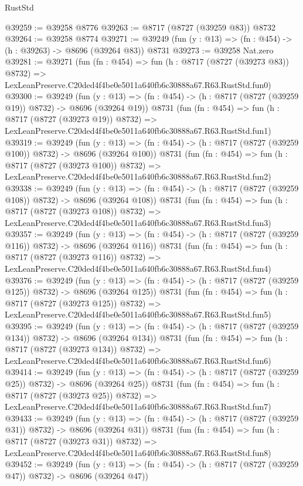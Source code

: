 \begin{lexlean}{RustStd}
\begin{coremodule}
@39259 := @39258 @8776
@39263 := @8717 (@8727 (@39259 @83)) @8732
@39264 := @39258 @8774
@39271 := @39249 (fun (y : @13) => (fn : @454) -> (h : @39263) -> @8696 (@39264 @83)) @8731
@39273 := @39258 Nat.zero
@39281 := @39271
    (fun (fn : @454) =>
    fun (h : @8717 (@8727 (@39273 @83)) @8732) =>
    LexLeanPreserve.C20ded4f4be0e5011a640fb6c30888a67.R63.RustStd.fun0)
@39300 := @39249
    (fun (y : @13) => (fn : @454) -> (h : @8717 (@8727 (@39259 @19)) @8732) -> @8696 (@39264 @19))
    @8731
    (fun (fn : @454) =>
    fun (h : @8717 (@8727 (@39273 @19)) @8732) =>
    LexLeanPreserve.C20ded4f4be0e5011a640fb6c30888a67.R63.RustStd.fun1)
@39319 := @39249
    (fun (y : @13) => (fn : @454) -> (h : @8717 (@8727 (@39259 @100)) @8732) -> @8696 (@39264 @100))
    @8731
    (fun (fn : @454) =>
    fun (h : @8717 (@8727 (@39273 @100)) @8732) =>
    LexLeanPreserve.C20ded4f4be0e5011a640fb6c30888a67.R63.RustStd.fun2)
@39338 := @39249
    (fun (y : @13) => (fn : @454) -> (h : @8717 (@8727 (@39259 @108)) @8732) -> @8696 (@39264 @108))
    @8731
    (fun (fn : @454) =>
    fun (h : @8717 (@8727 (@39273 @108)) @8732) =>
    LexLeanPreserve.C20ded4f4be0e5011a640fb6c30888a67.R63.RustStd.fun3)
@39357 := @39249
    (fun (y : @13) => (fn : @454) -> (h : @8717 (@8727 (@39259 @116)) @8732) -> @8696 (@39264 @116))
    @8731
    (fun (fn : @454) =>
    fun (h : @8717 (@8727 (@39273 @116)) @8732) =>
    LexLeanPreserve.C20ded4f4be0e5011a640fb6c30888a67.R63.RustStd.fun4)
@39376 := @39249
    (fun (y : @13) => (fn : @454) -> (h : @8717 (@8727 (@39259 @125)) @8732) -> @8696 (@39264 @125))
    @8731
    (fun (fn : @454) =>
    fun (h : @8717 (@8727 (@39273 @125)) @8732) =>
    LexLeanPreserve.C20ded4f4be0e5011a640fb6c30888a67.R63.RustStd.fun5)
@39395 := @39249
    (fun (y : @13) => (fn : @454) -> (h : @8717 (@8727 (@39259 @134)) @8732) -> @8696 (@39264 @134))
    @8731
    (fun (fn : @454) =>
    fun (h : @8717 (@8727 (@39273 @134)) @8732) =>
    LexLeanPreserve.C20ded4f4be0e5011a640fb6c30888a67.R63.RustStd.fun6)
@39414 := @39249
    (fun (y : @13) => (fn : @454) -> (h : @8717 (@8727 (@39259 @25)) @8732) -> @8696 (@39264 @25))
    @8731
    (fun (fn : @454) =>
    fun (h : @8717 (@8727 (@39273 @25)) @8732) =>
    LexLeanPreserve.C20ded4f4be0e5011a640fb6c30888a67.R63.RustStd.fun7)
@39433 := @39249
    (fun (y : @13) => (fn : @454) -> (h : @8717 (@8727 (@39259 @31)) @8732) -> @8696 (@39264 @31))
    @8731
    (fun (fn : @454) =>
    fun (h : @8717 (@8727 (@39273 @31)) @8732) =>
    LexLeanPreserve.C20ded4f4be0e5011a640fb6c30888a67.R63.RustStd.fun8)
@39452 := @39249
    (fun (y : @13) => (fn : @454) -> (h : @8717 (@8727 (@39259 @47)) @8732) -> @8696 (@39264 @47))

\end{coremodule}
\end{lexlean}
